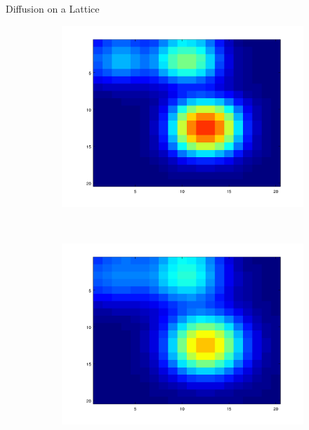\documentclass[10pt]{beamer}
\begin{document}
\begin{frame}{Diffusion on a Lattice}
\begin{figure}[!h]
\begin{subfigure}[b]{0.25\textwidth}
			\includegraphics[width=\textwidth]{images/anim_50.png}
		\end{subfigure}~
		\begin{subfigure}[b]{0.25\textwidth}
			\includegraphics[width= \textwidth]{images/anim_80.png}
		\end{subfigure}~
		\begin{subfigure}[b]{0.25\textwidth}

\end{subfigure}
\end{figure}
\end{frame}
\end{document}
